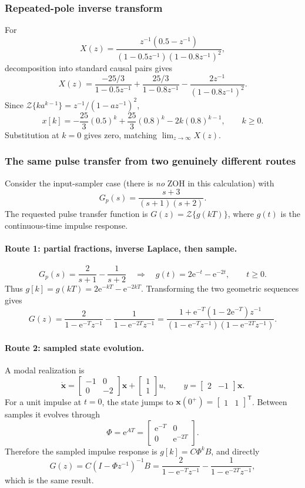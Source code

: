 \documentclass[11pt]{article}
\newcommand{\Z}{\mathcal{Z}}
\newcommand{\e}{\mathrm{e}}
\begin{document}
\subsubsection*{Repeated-pole inverse transform}

For
\[
X(z)=\frac{z^{-1}(0.5-z^{-1})}
{(1-0.5z^{-1})(1-0.8z^{-1})^2},
\]
decomposition into standard causal pairs gives
\[
X(z)=\frac{-25/3}{1-0.5z^{-1}}
+\frac{25/3}{1-0.8z^{-1}}
-\frac{2z^{-1}}{(1-0.8z^{-1})^2}.
\]
Since $\Z\{k a^{k-1}\}=z^{-1}/(1-az^{-1})^2$,
\[
x[k]=-\frac{25}{3}(0.5)^k+\frac{25}{3}(0.8)^k
-2k(0.8)^{k-1},\qquad k\ge0.
\]
Substitution at $k=0$ gives zero, matching $\lim_{z\to\infty}X(z)$.

\subsubsection*{The same pulse transfer from two genuinely different routes}

Consider the input-sampler case (there is \emph{no} ZOH in this calculation) with
\[
G_p(s)=\frac{s+3}{(s+1)(s+2)}.
\]
The requested pulse transfer function is $G(z)=\Z\{g(kT)\}$, where $g(t)$ is the continuous-time impulse response.

\paragraph{Route 1: partial fractions, inverse Laplace, then sample.}
\[
G_p(s)=\frac{2}{s+1}-\frac{1}{s+2}
\quad\Longrightarrow\quad
g(t)=2\e^{-t}-\e^{-2t},\qquad t\geq0.
\]
Thus $g[k]=g(kT)=2\e^{-kT}-\e^{-2kT}$.  Transforming the two geometric sequences gives
\[
G(z)=\frac{2}{1-\e^{-T}z^{-1}}
-\frac{1}{1-\e^{-2T}z^{-1}}
=\frac{1+\e^{-T}(1-2\e^{-T})z^{-1}}
{(1-\e^{-T}z^{-1})(1-\e^{-2T}z^{-1})}.
\]

\paragraph{Route 2: sampled state evolution.}
A modal realization is
\[
\dot{\mathbf{x}}=
\begin{bmatrix}-1&0\\0&-2\end{bmatrix}\mathbf{x}
+\begin{bmatrix}1\\1\end{bmatrix}u,
\qquad
y=\begin{bmatrix}2&-1\end{bmatrix}\mathbf{x}.
\]
For a unit impulse at $t=0$, the state jumps to
$\mathbf{x}(0^+)=\begin{bmatrix}1&1\end{bmatrix}^{\mathsf T}$.  Between samples it evolves through
\[
\Phi=\e^{AT}=
\begin{bmatrix}\e^{-T}&0\\0&\e^{-2T}\end{bmatrix}.
\]
Therefore the sampled impulse response is $g[k]=C\Phi^kB$, and directly
\[
G(z)=C(I-\Phi z^{-1})^{-1}B
=\frac{2}{1-\e^{-T}z^{-1}}
-\frac{1}{1-\e^{-2T}z^{-1}},
\]
which is the same result.
\end{document}
